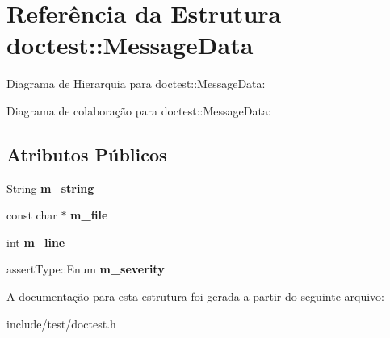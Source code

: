 \hypertarget{structdoctest_1_1MessageData}{}\section{Referência da Estrutura doctest\+:\+:Message\+Data}
\label{structdoctest_1_1MessageData}


Diagrama de Hierarquia para doctest\+:\+:Message\+Data\+:


Diagrama de colaboração para doctest\+:\+:Message\+Data\+:
\subsection*{Atributos Públicos}
\begin{DoxyCompactItemize}
\item 
\mbox{\label{structdoctest_1_1MessageData_a0ef5cfd7a399ee475d6357b6dcddfe53}} 
\hyperlink{classdoctest_1_1String}{String} {\bfseries m\+\_\+string}
\item 
\mbox{\label{structdoctest_1_1MessageData_acd1e6a5c4f03ed6e098cdab5956a3e17}} 
const char $\ast$ {\bfseries m\+\_\+file}
\item 
\mbox{\label{structdoctest_1_1MessageData_a7c1cf03250a68db5befbba63b3824d93}} 
int {\bfseries m\+\_\+line}
\item 
\mbox{\label{structdoctest_1_1MessageData_a24e0a3f475609ce8e02cecc4cb0d3b48}} 
assert\+Type\+::\+Enum {\bfseries m\+\_\+severity}
\end{DoxyCompactItemize}


A documentação para esta estrutura foi gerada a partir do seguinte arquivo\+:\begin{DoxyCompactItemize}
\item 
include/test/doctest.\+h\end{DoxyCompactItemize}

